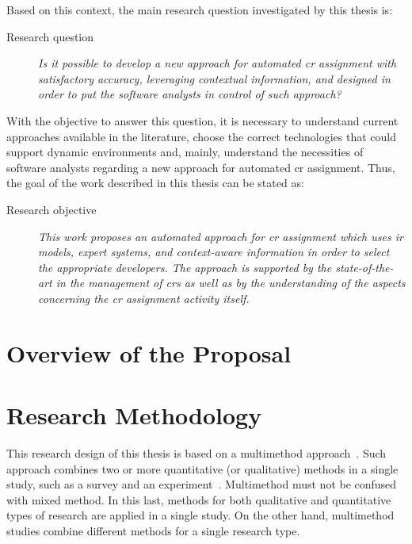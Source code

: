 Based on this context, the main research question investigated by this thesis is:

\begin{description}
  \item[Research question] \emph{Is it possible to develop a new approach for
  automated \ac{cr} assignment with satisfactory accuracy, leveraging
  contextual information, and designed in order to put the software analysts in
  control of such approach?}
\end{description}

With the objective to answer this question, it is necessary to understand
current approaches available in the literature, choose the correct technologies
that could support dynamic environments and, mainly, understand the necessities
of software analysts regarding a new approach for automated \ac{cr} assignment.
Thus, the goal of the work described in this thesis can be stated as:

\begin{description}
  \item[Research objective] \emph{This work proposes an automated approach for
  \ac{cr} assignment which uses \ac{ir} models, expert systems, and
  context-aware information in order to select the appropriate developers. The
  approach is supported by the state-of-the-art in the management of \acp{cr} as
  well as by the understanding of the aspects concerning the \ac{cr} assignment
  activity itself.}
\end{description}

\section{Overview of the Proposal}
\lipsum[1-5]

\section{Research Methodology}

This research design of this thesis is based on a multimethod
approach~\citep{Hesse-Biber2010}. Such approach combines two or more
quantitative (or qualitative) methods in a single study, such as a survey and an
experiment~\citep{Hesse-Biber2010}. Multimethod must not be confused with mixed
method. In this last, methods for both qualitative and quantitative types of
research are applied in a single study. On the other hand, multimethod studies
combine different methods for a single research type.

